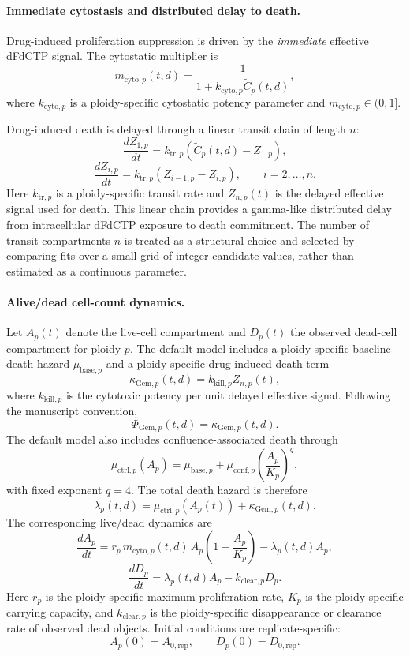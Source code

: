 \paragraph{Immediate cytostasis and distributed delay to death.}
Drug-induced proliferation suppression is driven by the \emph{immediate} effective dFdCTP signal. The cytostatic multiplier is
\[
m_{\mathrm{cyto},p}(t,d)
=
\frac{1}{1+k_{\mathrm{cyto},p}\widetilde{C}_{p}(t,d)},
\]
where $k_{\mathrm{cyto},p}$ is a ploidy-specific cytostatic potency parameter and $m_{\mathrm{cyto},p}\in(0,1]$.

Drug-induced death is delayed through a linear transit chain of length $n$:
\[
\frac{dZ_{1,p}}{dt}
=
k_{\mathrm{tr},p}\left(\widetilde{C}_{p}(t,d)-Z_{1,p}\right),
\]
\[
\frac{dZ_{i,p}}{dt}
=
k_{\mathrm{tr},p}\left(Z_{i-1,p}-Z_{i,p}\right),
\qquad i=2,\ldots,n.
\]
Here $k_{\mathrm{tr},p}$ is a ploidy-specific transit rate and $Z_{n,p}(t)$ is the delayed effective signal used for death. This linear chain provides a gamma-like distributed delay from intracellular dFdCTP exposure to death commitment. The number of transit compartments $n$ is treated as a structural choice and selected by comparing fits over a small grid of integer candidate values, rather than estimated as a continuous parameter.

\paragraph{Alive/dead cell-count dynamics.}
Let $A_p(t)$ denote the live-cell compartment and $D_p(t)$ the observed dead-cell compartment for ploidy $p$. The default model includes a ploidy-specific baseline death hazard $\mu_{\mathrm{base},p}$ and a ploidy-specific drug-induced death term
\[
\kappa_{\mathrm{Gem},p}(t,d)=k_{\mathrm{kill},p}Z_{n,p}(t),
\]
where $k_{\mathrm{kill},p}$ is the cytotoxic potency per unit delayed effective signal. Following the manuscript convention,
\[
\Phi_{\mathrm{Gem},p}(t,d)=\kappa_{\mathrm{Gem},p}(t,d).
\]
The default model also includes confluence-associated death through
\[
\mu_{\mathrm{ctrl},p}(A_p)
=
\mu_{\mathrm{base},p}
+
\mu_{\mathrm{conf},p}\left(\frac{A_p}{K_p}\right)^q,
\]
with fixed exponent $q=4$. The total death hazard is therefore
\[
\lambda_p(t,d)=\mu_{\mathrm{ctrl},p}(A_p(t))+\kappa_{\mathrm{Gem},p}(t,d).
\]
The corresponding live/dead dynamics are
\[
\frac{dA_p}{dt}
=
r_p\,m_{\mathrm{cyto},p}(t,d)\,
A_p\left(1-\frac{A_p}{K_p}\right)
-\lambda_p(t,d)A_p,
\]
\[
\frac{dD_p}{dt}
=
\lambda_p(t,d)A_p-k_{\mathrm{clear},p}D_p.
\]
Here $r_p$ is the ploidy-specific maximum proliferation rate, $K_p$ is the ploidy-specific carrying capacity, and $k_{\mathrm{clear},p}$ is the ploidy-specific disappearance or clearance rate of observed dead objects. Initial conditions are replicate-specific:
\[
A_p(0)=A_{0,\mathrm{rep}}, \qquad D_p(0)=D_{0,\mathrm{rep}}.
\]

